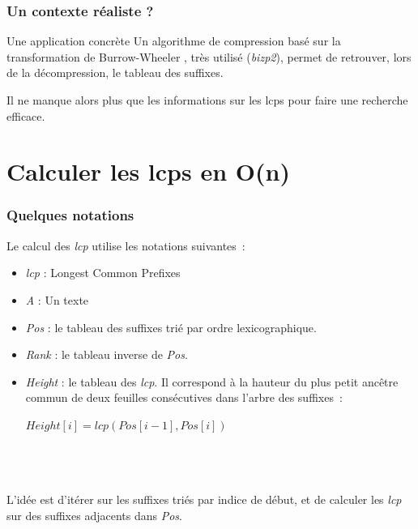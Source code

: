 \documentclass[10pt]{beamer}
\begin{document}
\begin{frame}
  \frametitle{Un contexte réaliste ?}
  
  \begin{block}{Une application concrète}
    Un algorithme de compression basé sur la transformation de
    Burrow-Wheeler \cite{Burrows94}, très utilisé (\emph{bizp2}), permet
    de retrouver, lors de la décompression, le tableau des suffixes. 
    
    Il ne manque alors plus que les informations sur les lcps pour faire
    une recherche efficace. 
  \end{block}

\end{frame}

\section{Calculer les lcps en O(n)}
\label{sec:algo}


\begin{frame}
  \frametitle{Quelques notations}

  Le calcul des \textit{lcp} utilise les notations suivantes~:
  \begin{itemize}
  \item \textit{lcp} : Longest Common Prefixes
  \item \textit{A} : Un texte
  \item \textit{Pos} : le tableau des suffixes trié par ordre lexicographique.
  \item \textit{Rank} : le tableau inverse de \textit{Pos}.
  \item \textit{Height} : le tableau des \textit{lcp}. Il correspond à la
    hauteur du plus petit ancêtre commun de deux feuilles consécutives dans
    l'arbre des suffixes~:
    \begin{center}
    $\mathit{Height}[i] = \mathit{lcp}(\mathit{Pos}[i-1], \mathit{Pos}[i])$
    \end{center}
  \end{itemize}
  \hfill \\ \hfill \\ \hfill \\

  L'idée est d'itérer sur les suffixes triés par indice de début, et de
  calculer les \textit{lcp} sur des suffixes adjacents dans \textit{Pos}.
\end{frame}
\end{document}
